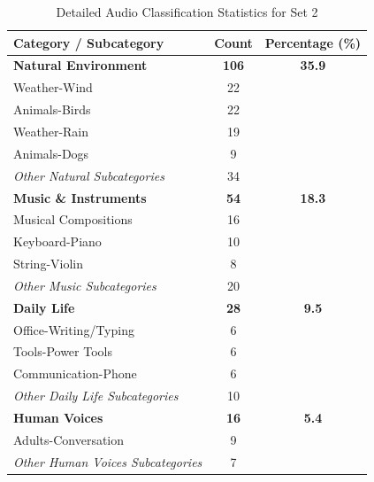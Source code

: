 \begin{table}[h!]
    \centering
    \caption{Detailed Audio Classification Statistics for Set 2}
    \label{tab:audio_stats_set2}
    \begin{tabularx}{\linewidth}{l S[table-format=3.0] S[table-format=2.1]}
        \toprule
        \textbf{Category / Subcategory} & \textbf{Count} & {\textbf{Percentage (\%)}} \\
        \midrule
        
        \textbf{Natural Environment} & \textbf{106} & \textbf{35.9} \\
        \quad Weather-Wind & 22 & {} \\
        \quad Animals-Birds & 22 & {} \\
        \quad Weather-Rain & 19 & {} \\
        \quad Animals-Dogs & 9 & {} \\
        \quad \textit{Other Natural Subcategories} & 34 & {} \\
        
        \addlinespace
        
        \textbf{Music \& Instruments} & \textbf{54} & \textbf{18.3} \\
        \quad Musical Compositions & 16 & {} \\
        \quad Keyboard-Piano & 10 & {} \\
        \quad String-Violin & 8 & {} \\
        \quad \textit{Other Music Subcategories} & 20 & {} \\
        
        \addlinespace
        
        \textbf{Daily Life} & \textbf{28} & \textbf{9.5} \\
        \quad Office-Writing/Typing & 6 & {} \\
        \quad Tools-Power Tools & 6 & {} \\
        \quad Communication-Phone & 6 & {} \\
        \quad \textit{Other Daily Life Subcategories} & 10 & {} \\
        
        \addlinespace
        
        \textbf{Human Voices} & \textbf{16} & \textbf{5.4} \\
        \quad Adults-Conversation & 9 & {} \\
        \quad \textit{Other Human Voices Subcategories} & 7 & {} \\
        

\end{tabularx}
\end{table}
